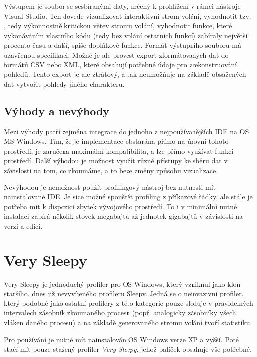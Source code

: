 \documentclass[czech,BP]{thesiskiv}
\begin{document}
Výstupem je soubor se sesbíranými daty, určený k prohlížení v rámci nástroje Visual Studio. Ten dovede vizualizovat interaktivní strom volání, vyhodnotit tzv. , tedy výkonnostně kritickou větev stromu volání, vyhodnotit funkce, které vykonáváním vlastního kódu (tedy bez volání ostatních funkcí) zabíraly největší procento času a další, spíše doplňkové funkce. Formát výstupního souboru má uzavřenou specifikaci. Možné je ale provést export zformátovaných dat do formátů CSV nebo XML, které obsahují potřebné údaje pro zrekonstruování pohledů. Tento export je ale ztrátový, a tak neumožňuje na základě obsažených dat vytvořit pohledy jiného charakteru.

\subsection*{Výhody a nevýhody}

Mezi výhody patří zejména integrace do jednoho z nejpoužívanějších IDE na OS MS Windows. Tím, že je implementace obstarána přímo na úrovni tohoto prostředí, je zaručena maximální kompatibilita, a lze přímo využívat funkcí prostředí. Další výhodou je možnost využít různé přístupy ke sběru dat v závislosti na tom, co zkoumáme, a to beze změny způsobu vizualizace.

Nevýhodou je nemožnost použít profilingový nástroj bez nutnosti mít nainstalované IDE. Je sice možné spouštět profiling z příkazové řádky, ale stále je potřeba mít k dispozici zbytek vývojového prostředí. To i v minimální nutné instalaci zabírá několik stovek megabajtů až jednotek gigabajtů v závislosti na verzi a edici.




\section{Very Sleepy}

Very Sleepy je jednoduchý profiler pro OS Windows, který vzniknul jako klon staršího, dnes již nevyvíjeného profileru Sleepy. Jedná se o neinvazivní profiler, který podobně jako ostatní profilery z této kategorie pouze sleduje v pravidelných intervalech zásobník zkoumaného procesu (popř. analogicky zásobníky všech vláken daného procesu) a na základě generovaného stromu volání tvoří statistiku.

Pro používání je nutné mít nainstalován OS Windows verze XP a vyšší. Poté stačí mít pouze stažený profiler \emph{Very Sleepy}, jehož balíček obsahuje vše potřebné.
\end{document}
